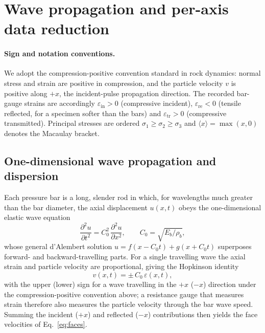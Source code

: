 \documentclass[11pt]{article}
\newcommand{\Cz}{C_{0}}
\newcommand{\eps}{\varepsilon}
\begin{document}
\section{Wave propagation and per-axis data reduction}\label{sec:reduction}

\paragraph{Sign and notation conventions.} We adopt the compression-positive
convention standard in rock dynamics: normal stress and strain are positive in
compression, and the particle velocity $v$ is positive along $+x$, the
incident-pulse propagation direction. The recorded bar-gauge strains are
accordingly $\eps_{\mathrm{in}}>0$ (compressive incident), $\eps_{\mathrm{re}}<0$
(tensile reflected, for a specimen softer than the bars) and
$\eps_{\mathrm{tr}}>0$ (compressive transmitted). Principal stresses are ordered
$\sigma_1\ge\sigma_2\ge\sigma_3$ and $\langle x\rangle=\max(x,0)$ denotes the
Macaulay bracket.

\subsection{One-dimensional wave propagation and dispersion}\label{sec:wave}

Each pressure bar is a long, slender rod in which, for wavelengths much greater
than the bar diameter, the axial displacement $u(x,t)$ obeys the
one-dimensional elastic wave equation
\begin{equation}
\frac{\partial^2 u}{\partial t^2}=\Cz^2\,\frac{\partial^2 u}{\partial x^2},
\qquad \Cz=\sqrt{E_b/\rho_b},
\label{eq:wave}
\end{equation}
whose general d'Alembert solution $u=f(x-\Cz t)+g(x+\Cz t)$ superposes
forward- and backward-travelling parts. For a single travelling wave the axial
strain and particle velocity are proportional, giving the Hopkinson identity
\begin{equation}
v(x,t)=\pm\,\Cz\,\eps(x,t),
\label{eq:hopkinson}
\end{equation}
with the upper (lower) sign for a wave travelling in the $+x$ ($-x$) direction
under the compression-positive convention above; a resistance gauge that measures
strain therefore also measures the particle velocity through the bar wave speed.
Summing the incident ($+x$) and reflected ($-x$) contributions then yields the
face velocities of Eq.~\eqref{eq:faces}.
\end{document}
